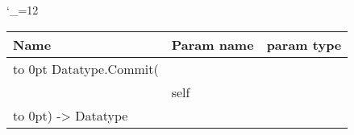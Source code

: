 \begingroup \catcode`\_=12 \tt
\begin{tabular}{lll}
\toprule
\textrm{Name}&\textrm{Param name}&\textrm{param type}\\
\midrule
\hbox to 0pt {Datatype.Commit(\hss}\\
& self\\
\hbox to 0pt{) -> Datatype\hss}\\
\bottomrule
\end{tabular}
\endgroup
